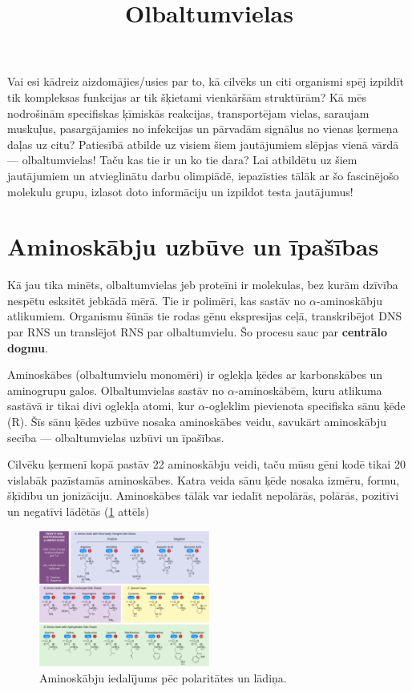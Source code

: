 \documentclass[12pt,a4paper]{article}
\title{\textbf{Olbaltumvielas}}
\author{}
\date{}
\newcommand{\figref}[1]{\ref{#1} attēls}
\begin{document}
\maketitle

    Vai esi kādreiz aizdomājies/usies par to, kā cilvēks un citi organismi spēj izpildīt tik kompleksas funkcijas ar tik šķietami vienkāršām struktūrām? Kā mēs nodrošinām specifiskas ķīmiskās reakcijas, transportējam vielas, saraujam muskuļus, pasargājamies no infekcijas un pārvadām signālus no vienas ķermeņa daļas uz citu? Patiesībā atbilde uz visiem šiem jautājumiem slēpjas vienā vārdā — olbaltumvielas! Taču kas tie ir un ko tie dara? Lai atbildētu uz šiem jautājumiem un atvieglinātu darbu olimpiādē, iepazīsties tālāk ar šo fascinējošo molekulu grupu, izlasot doto informāciju un izpildot testa jautājumus!


\section{Aminoskābju uzbūve un īpašības}

Kā jau tika minēts, olbaltumvielas jeb proteīni ir molekulas, bez kurām dzīvība nespētu esksitēt jebkādā mērā. Tie ir polimēri, kas sastāv no $\alpha$-aminoskābju atlikumiem. Organismu šūnās tie rodas gēnu ekspresijas ceļā, transkribējot DNS par RNS un translējot RNS par olbaltumvielu. Šo procesu sauc par \textbf{centrālo dogmu}.

Aminoskābes (olbaltumvielu monomēri) ir oglekļa ķēdes ar karbonskābes un aminogrupu galos. Olbaltumvielas sastāv no $\alpha$-aminoskābēm, kuru atlikuma sastāvā ir tikai divi oglekļa atomi, kur $\alpha$-ogleklim pievienota specifiska sānu ķēde (R). Šīs sānu ķēdes uzbūve nosaka aminoskābes veidu, savukārt aminoskābju secība — olbaltumvielas uzbūvi un īpašības.

Cilvēku ķermenī kopā pastāv 22 aminoskābju veidi, taču mūsu gēni kodē tikai 20 vislabāk pazīstamās aminoskābes. Katra veida sānu ķēde nosaka izmēru, formu, šķīdību un jonizāciju. Aminoskābes tālāk var iedalīt nepolārās, polārās, pozitīvi un negatīvi lādētās (\figref{fig:aminoskabes})

\begin{figure}[H]
    \centering
    \includegraphics[width=0.5\textwidth]{atteli/proteīni-1.png}
    \caption{Aminoskābju iedalījums pēc polaritātes un lādiņa.}
    \label{fig:aminoskabes}
\end{figure}
\end{document}
